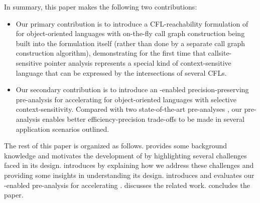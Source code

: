 In summary, this paper makes the following two  contributions:
\begin{itemize}
    \item Our primary contribution is to introduce a CFL-reachability formulation \LFCR of
      for object-oriented languages 
   with on-the-fly call graph construction being built into the formulation itself (rather than done by
   a separate call graph construction algorithm), demonstrating for the first time that callsite-sensitive pointer analysis represents a special kind of context-sensitive language that can be expressed by the intersections of several CFLs.
    
    \item Our secondary contribution is to introduce an \LFCR-enabled precision-preserving pre-analysis for 
    accelerating  for object-oriented languages with selective context-sensitivity. 
    Compared with two state-of-the-art pre-analyses  \cite{lu2021selective,li2018precision}, our pre-analysis 
    enables
better efficiency-precision trade-offs to be made in several application scenarios outlined.
\begin{comment}    
    Our evaluation, conducted
in   \qilin~\cite{he_et_al:LIPIcs.ECOOP.2022.30} using 
a set of 13 popular Java benchmarks/applications, shows that our pre-analysis
enables  
\kcs{k} to achieve an average speedup of 
\OVERALLTOOLSPEEDUP while incurring  %
small pre-analysis overheads (\toolPreTime seconds on average).
\end{comment}
\end{itemize}

The rest of this paper is organized as follows.
 provides some background knowledge and motivates the
development of \LFCR by highlighting several challenges faced in its design.  introduces 
\LFCR by explaining  how we address these challenges and providing some
insights in understanding its design.     introduces and evaluates our \LFCR-enabled  pre-analysis for accelerating
. 
 discusses the related work.   concludes the paper.